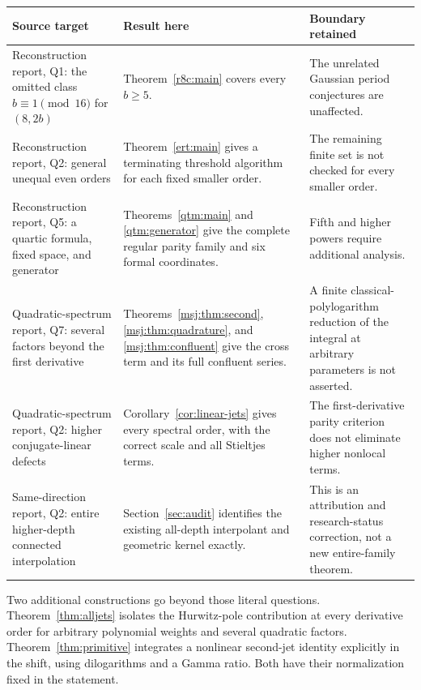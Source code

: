 \begin{longtable}{@{}>{\raggedright\arraybackslash}p{}>{\raggedright\arraybackslash}p{}>{\raggedright\arraybackslash}p{}@{}}
\toprule
Source target & Result here & Boundary retained\\
\midrule
\endhead
Reconstruction report, Q1: the omitted class
$b\equiv1\pmod{16}$ for $(8,2b)$ \cite{Reconstruction}
& Theorem~\ref{r8c:main} covers every $b\ge5$.
& The unrelated Gaussian period conjectures are unaffected.\\[5pt]
Reconstruction report, Q2: general unequal even orders
& Theorem~\ref{ert:main} gives a terminating threshold algorithm for
each fixed smaller order.
& The remaining finite set is not checked for every smaller order.\\[5pt]
Reconstruction report, Q5: a quartic formula, fixed space, and generator
& Theorems~\ref{qtm:main} and \ref{qtm:generator} give the complete
regular parity family and six formal coordinates.
& Fifth and higher powers require additional analysis.\\[5pt]
Quadratic-spectrum report, Q7: several factors beyond the first derivative
\cite{Quadratic}
& Theorems~\ref{msj:thm:second}, \ref{msj:thm:quadrature}, and
\ref{msj:thm:confluent} give the cross term and its full confluent series.
& A finite classical-polylogarithm reduction of the integral at arbitrary
parameters is not asserted.\\[5pt]
Quadratic-spectrum report, Q2: higher conjugate-linear defects
& Corollary~\ref{cor:linear-jets} gives every spectral order, with the
correct scale and all Stieltjes terms.
& The first-derivative parity criterion does not eliminate higher
nonlocal terms.\\[5pt]
Same-direction report, Q2: entire higher-depth connected interpolation
\cite{SameDirection}
& Section~\ref{sec:audit} identifies the existing all-depth interpolant
and geometric kernel exactly.
& This is an attribution and research-status correction, not a new
entire-family theorem.\\
\bottomrule
\end{longtable}

Two additional constructions go beyond those literal questions.
Theorem~\ref{thm:alljets} isolates the Hurwitz-pole contribution at every
derivative order for arbitrary polynomial weights and several quadratic
factors.  Theorem~\ref{thm:primitive} integrates a nonlinear second-jet
identity explicitly in the shift, using dilogarithms and a Gamma ratio.
Both have their normalization fixed in the statement.

